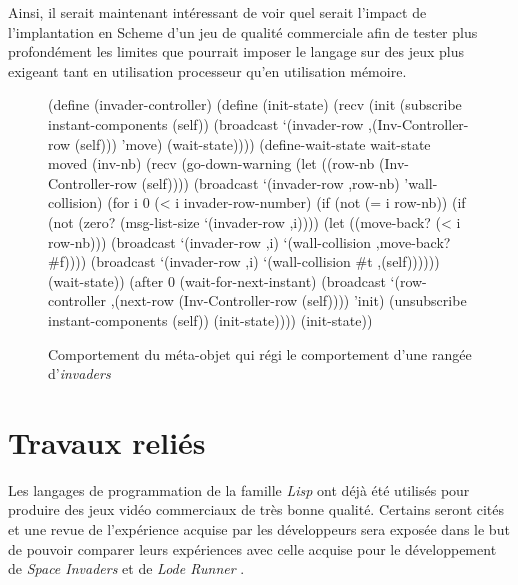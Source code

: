 \documentclass[12pt,oneside,letterpaper,francais]{book}
\newcommand{\lr}{{\textit{Lode Runner }}}
\newcommand{\si}{{\textit{Space Invaders }}}
\newcommand{\lisp}{{\textit{Lisp }}}
\newcommand{\scheme}[1]{\selectlanguage{english}{\tt #1}\selectlanguage{french}}
\begin{document}
Ainsi, il serait maintenant intéressant de voir quel serait l'impact
de l'implantation en Scheme d'un jeu de qualité commerciale afin de
tester plus profondément les limites que pourrait imposer le langage
sur des jeux plus exigeant tant en utilisation processeur qu'en
utilisation mémoire.


\begin{figure}[htb!]
  \begin{schemecode}
(define (invader-controller)
  (define (init-state)
    (recv
     (init
      (subscribe instant-components (self))
      (broadcast `(invader-row ,(Inv-Controller-row (self)))
                 'move)
      (wait-state))))
  (define-wait-state wait-state moved (inv-nb)
    (recv
     (go-down-warning
      (let ((row-nb (Inv-Controller-row (self))))
        (broadcast `(invader-row ,row-nb) 'wall-collision)
        (for i 0 (< i invader-row-number)
             (if (not (= i row-nb))
                 (if (not (zero? (msg-list-size `(invader-row ,i))))
                     (let ((move-back? (< i row-nb)))
                       (broadcast `(invader-row ,i)
                                  `(wall-collision ,move-back? \#f))))
                 (broadcast `(invader-row ,i)
                            `(wall-collision  \#t ,(self))))))
      (wait-state))
     (after 0
            (wait-for-next-instant)
            (broadcast `(row-controller
                         ,(next-row (Inv-Controller-row (self))))
                       'init)
            (unsubscribe instant-components (self))
            (init-state))))
  (init-state))
  \end{schemecode}
  \caption{Comportement du méta-objet \scheme{invader-controller} qui
    régi le comportement d'une rangée d'\textit{invaders}}
  \label{Exp:inv-cnt}
\end{figure}





\chapter{Travaux reliés}

Les langages de programmation de la famille \lisp ont déjà été utilisés
pour produire des jeux vidéo commerciaux de très bonne
qualité. Certains seront cités et une revue de l'expérience acquise
par les développeurs sera exposée dans le but de pouvoir comparer
leurs expériences avec celle acquise pour le développement de \si et
de \lr.
\end{document}
